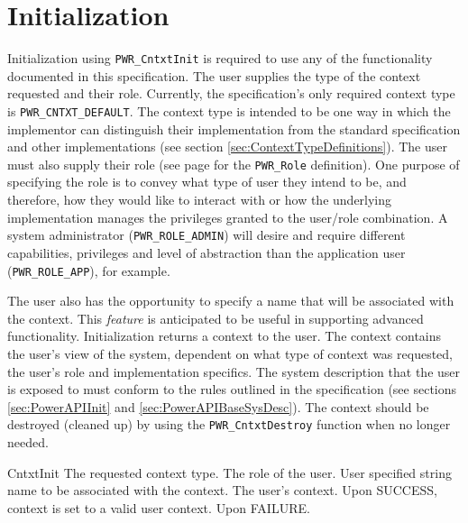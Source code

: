 \section{Initialization}\label{sec:Initialization}

Initialization using \texttt{PWR_CntxtInit} is required to use any of the functionality documented in this specification.
The user supplies the type of the context requested and their role. 
Currently, the specification's only required context type is \texttt{PWR_CNTXT_DEFAULT}.
The context type is intended to be one way in which the implementor can distinguish their implementation from the standard specification and other implementations (see section \ref{sec:ContextTypeDefinitions}).
The user must also supply their role (see page \pageref{type:Role} for the \texttt{PWR_Role} definition).
One purpose of specifying the role is to convey what type of user they intend to be, and therefore, how they would like to interact with or how the underlying implementation manages the privileges granted to the user/role combination.
A system administrator (\texttt{PWR_ROLE_ADMIN}) will desire and require different capabilities, privileges and level of abstraction than the application user (\texttt{PWR_ROLE_APP}), for example.

The user also has the opportunity to specify a name that will be associated with the context. 
This \textit{feature} is anticipated to be useful in supporting advanced functionality.
Initialization returns a context to the user.
The context contains the user's view of the system, dependent on what type of context was requested, the user's role and implementation specifics.
The system description that the user is exposed to must conform to the rules outlined in the specification (see sections \ref{sec:PowerAPIInit} and \ref{sec:PowerAPIBaseSysDesc}).
The context should be destroyed (cleaned up) by using the \texttt{PWR_CntxtDestroy} function when no longer needed.

\begin{prototype}{CntxtInit}
	 	{The requested context type.}
		{\pInput} 	{The role of the user.}
	  	{\pInput} 	{User specified string name to be associated with the context.}
		{The user's context.}
				{Upon SUCCESS, context is set to a valid user context.}
				{Upon FAILURE.}
\end{prototype}

